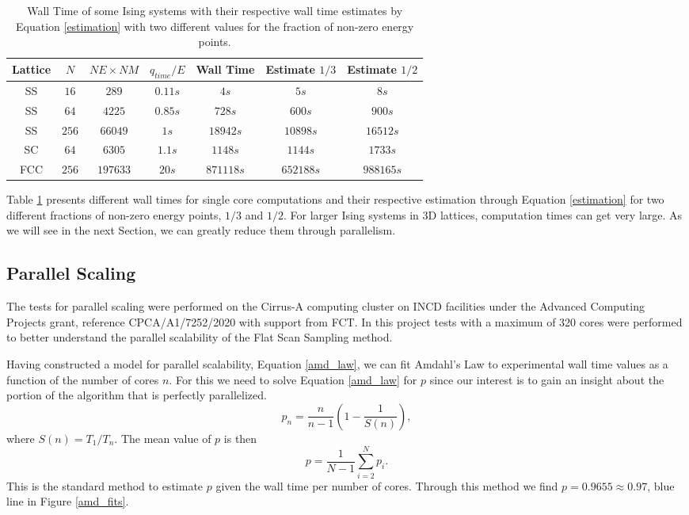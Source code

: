 \begin{table}[h]
\centering
\caption{Wall Time of some Ising systems with their respective wall time estimates by Equation \ref{estimation} with two different values for the fraction of non-zero energy points.} 
\begin{tabular}{c|c|c|c|c|c|c}
Lattice & $N$   & $NE \times NM$ & $q_{time}/E$ & Wall Time & Estimate $1/3$ & Estimate $1/2$ \\ \hline
SS      & $16$  & $289$                         & $0.11s $        & $4s$        &$ 5s$                  & $8s$                  \\
SS      & $64$  & $4225$                        & $0.85s$         & $728s$      & $600s $               & $900s    $ \\
SS      & $256$ & $66049$                       & $1s$            & $18942s$    & $10898s $             & $16512s  $ \\
SC      & $64$  & $6305$                        & $1.1s $         & $1148s$     & $1144s$              & $1733s $           \\
FCC     & $256$ & $197633$                      & $20s$           &$ 871118s$   & $652188s$      & $988165s$            
\end{tabular}
\label{wall_time_table}
\end{table}

	Table \ref{wall_time_table} presents different wall times for single core computations and their respective estimation through Equation \ref{estimation} for two different fractions of non-zero energy points, $1/3$ and $1/2$. For larger Ising systems in 3D lattices, computation times can get very large. As we will see in the next Section, we can greatly reduce them through parallelism. 


\subsection{Parallel Scaling}
	
	The tests for parallel scaling were performed on the Cirrus-A computing cluster on INCD facilities under the Advanced Computing Projects grant, reference CPCA/A1/7252/2020 with support from FCT. In this project tests with a maximum of 320 cores were performed to better understand the parallel scalability of the Flat Scan Sampling method.

	Having constructed a model for parallel scalability, Equation \ref{amd_law}, we can fit Amdahl's Law to experimental wall time values as a function of the number of cores $n$. For this we need to solve Equation \ref{amd_law} for $p$ since our interest is to gain an insight about the portion of the algorithm that is perfectly parallelized.
\begin{equation}
	p_n = \frac{n}{n-1} \left( 1 - \frac{1}{S(n)} \right),
\end{equation}
where $S(n) = T_1 / T_n$. The mean value of $p$ is then
\begin{equation}
	p = \frac{1}{N-1} \sum_{i=2}^{N} p_i.
\end{equation}
This is the standard method to estimate $p$ given the wall time per number of cores. Through this method we find  $p=0.9655\approx 0.97$, blue line in Figure \ref{amd_fits}.

